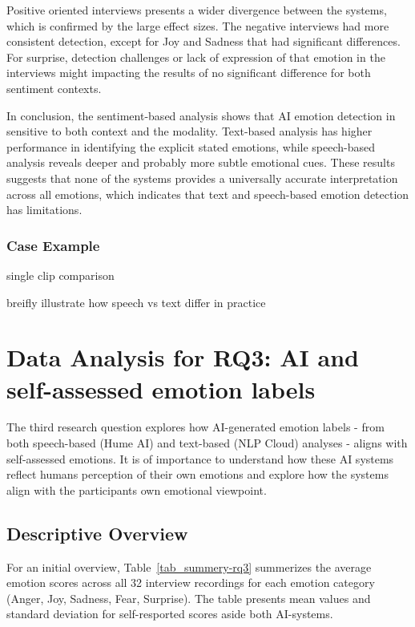 Positive oriented interviews presents a wider divergence between the systems, which is confirmed by the large effect sizes. 
The negative interviews had more consistent detection, except for Joy and Sadness that had significant differences. 
For surprise, detection challenges or lack of expression of that emotion in the interviews might impacting the results of no significant difference for both sentiment contexts. 

In conclusion, the sentiment-based analysis shows that AI emotion detection in sensitive to both context and the modality. 
Text-based analysis has higher performance in identifying the explicit stated emotions, while speech-based 
analysis reveals deeper and probably more subtle emotional cues. 
These results suggests that none of the systems provides a universally accurate interpretation across all emotions,
which indicates that text and speech-based emotion detection has limitations. 


\subsubsection{Case Example}
single clip comparison 

breifly illustrate how speech vs text differ in practice 




\section{Data Analysis for RQ3: AI and self-assessed emotion labels}

The third research question explores how AI-generated emotion labels - from both speech-based (Hume AI) and text-based (NLP Cloud) 
analyses - aligns with self-assessed emotions. It is of importance to understand how these AI systems reflect humans perception of 
their own emotions and explore how the systems align with the participants own emotional viewpoint.  
\subsection{Descriptive Overview}

For an initial overview, Table~\ref{tab_summery-rq3} summerizes the average emotion scores across all 32 interview recordings 
for each emotion category (Anger, Joy, Sadness, Fear, Surprise). The table presents mean values and standard deviation for self-resported scores 
aside both AI-systems.

